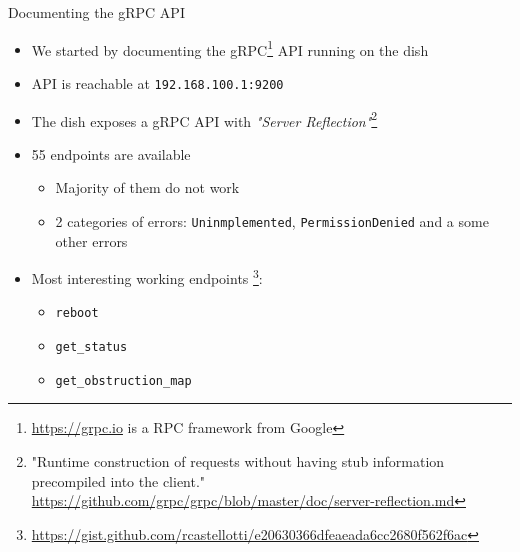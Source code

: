 \documentclass[NET,english,beameralt]{tumbeamer}
\begin{document}
\begin{frame}{Documenting the gRPC API}
    \begin{itemize}
        \item We started by documenting the gRPC\footnote{\url{https://grpc.io} is a RPC framework from Google} API
              running on the dish
        \item API is reachable at \texttt{192.168.100.1:9200}
        \item The dish exposes a gRPC API with \emph{"Server Reflection"}\footnote{"Runtime construction of requests
              without having stub information precompiled into the client."
              \url{https://github.com/grpc/grpc/blob/master/doc/server-reflection.md}}
        \item 55 endpoints are available
        \begin{itemize}
            \item Majority of them do not work
            \item 2 categories of errors: \texttt{Uninmplemented}, \texttt{PermissionDenied} and a some other errors 
        \end{itemize}
        \item Most interesting working endpoints
              \footnote{\url{https://gist.github.com/rcastellotti/e20630366dfeaeada6cc2680f562f6ac}}: 
            \begin{itemize}
                \item \texttt{reboot}
                \item \texttt{get\_status}
                \item \texttt{get\_obstruction\_map}
            \end{itemize}
    \end{itemize}
\end{frame}
\end{document}
